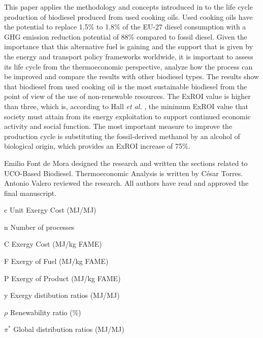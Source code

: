 \documentclass[sustainability,article,accept,moreauthors,pdftex,12pt,a4paper]{mdpi}
\begin{document}
This paper applies the methodology and concepts introduced in \cite{FontdeMora2012,FontdeMora2013,Torres2012b} to the life cycle production of biodiesel produced from used cooking oils. Used cooking oils have the potential to replace 1.5\% to 1.8\% of the EU-27 diesel consumption with a GHG emission reduction potential of 88\% compared to fossil diesel. Given the importance that this alternative fuel is gaining and the support that is given by the energy and transport policy frameworks worldwide, it is important to assess its life cycle from the thermoeconomic perspective, analyze how the process can be improved and compare the results with other biodiesel types. The results show that biodiesel from used cooking oil is the most sustainable biodiesel from the point of view of the use of non-renewable resources. The ExROI value is higher than three, which is, according to Hall \textit{et al.} \cite{Hall2009}, the minimum ExROI value that society must attain from its energy exploitation to support continued economic activity and social function. The most important measure to improve the production cycle is substituting the fossil-derived methanol by an alcohol of biological origin, which provides an ExROI increase of 75\%.

Emilio Font de Mora designed the research and written the sections related to UCO-Based Biodiesel. Thermoeconomic Analysis is written by C\'esar Torres. Antonio Valero reviewed the research. All authors have read and approved the final manuscript.


\vspace{-6pt}
\begin{list}{}{
 \renewcommand*{\makelabel}[1]{\hspace{\labelsep}\raggedleft #1} 
 \setlength{\labelwidth}{3em}
 \setlength{\leftmargin}{\labelwidth}
 \setlength{\parsep}{0pt}
 \setlength{\itemsep}{0pt}
 \sloppy}
 \item[c] Unit Exergy Cost (MJ/MJ)
 \item[n] Number of processes
 \item[C] Exergy Cost (MJ/kg FAME) 
 \item[F] Exergy of Fuel (MJ/kg FAME)
 \item[P] Exergy of Product (MJ/kg FAME)
 \item[y] Exergy distibution ratios (MJ/MJ)
 \item[$\rho$] Renewability ratio (\%)
 \item[$\pi^*$] Global distribution ratios (MJ/MJ)
\end{list}
\end{document}

